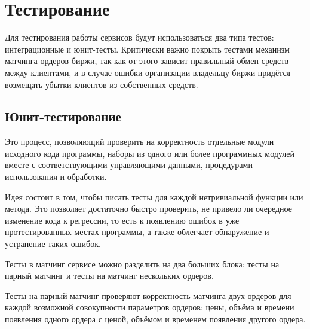 \section{Тестирование}\label{sec:testing}

Для тестирования работы сервисов будут использоваться два типа тестов: интеграционные и юнит-тесты. Критически важно покрыть тестами механизм матчинга ордеров биржи, так как от этого зависит правильный обмен средств между клиентами, и в случае ошибки организации-владельцу биржи придётся возмещать убытки клиентов из собственных средств.

\subsection{Юнит-тестирование}

Это процесс, позволяющий проверить на корректность отдельные модули исходного кода программы, наборы из одного или более программных модулей вместе с соответствующими управляющими данными, процедурами использования и обработки.

Идея состоит в том, чтобы писать тесты для каждой нетривиальной функции или метода. Это позволяет достаточно быстро проверить, не привело ли очередное изменение кода к регрессии, то есть к появлению ошибок в уже протестированных местах программы, а также облегчает обнаружение и устранение таких ошибок.

Тесты в матчинг сервисе можно разделить на два больших блока: тесты на парный матчинг и тесты на матчинг нескольких ордеров.

Тесты на парный матчинг проверяют корректность матчинга двух ордеров для каждой возможной совокупности параметров ордеров: цены, объёма и времени появления одного ордера с ценой, объёмом и временем появления  другого ордера.

